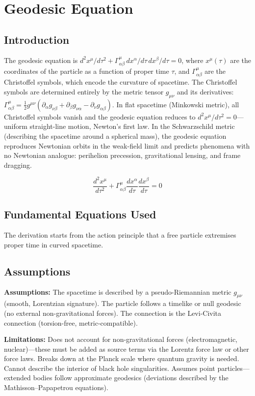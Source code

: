 \chapter{Geodesic Equation}

\section*{Introduction}

The geodesic equation is $d^2 x^\mu/d\tau^2 + \Gamma^\mu_{\alpha\beta}\,dx^\alpha/d\tau\,dx^\beta/d\tau = 0$, where $x^\mu(\tau)$ are the coordinates of the particle as a function of proper time $\tau$, and $\Gamma^\mu_{\alpha\beta}$ are the Christoffel symbols, which encode the curvature of spacetime. The Christoffel symbols are determined entirely by the metric tensor $g_{\mu\nu}$ and its derivatives: $\Gamma^\mu_{\alpha\beta} = \frac{1}{2}g^{\mu\nu}(\partial_\alpha g_{\nu\beta} + \partial_\beta g_{\nu\alpha} - \partial_\nu g_{\alpha\beta})$. In flat spacetime (Minkowski metric), all Christoffel symbols vanish and the geodesic equation reduces to $d^2 x^\mu/d\tau^2 = 0$---uniform straight-line motion, Newton's first law. In the Schwarzschild metric (describing the spacetime around a spherical mass), the geodesic equation reproduces Newtonian orbits in the weak-field limit and predicts phenomena with no Newtonian analogue: perihelion precession, gravitational lensing, and frame dragging.


\[
\frac{d^2 x^\mu}{d\tau^2}+\Gamma^\mu_{\alpha\beta}\frac{dx^\alpha}{d\tau}\frac{dx^\beta}{d\tau}=0
\]

\section*{Fundamental Equations Used}

The derivation starts from the action principle that a free particle extremises proper time in curved spacetime.

\section*{Assumptions}

\textbf{Assumptions:} The spacetime is described by a pseudo-Riemannian metric $g_{\mu\nu}$ (smooth, Lorentzian signature). The particle follows a timelike or null geodesic (no external non-gravitational forces). The connection is the Levi-Civita connection (torsion-free, metric-compatible).


\textbf{Limitations:} Does not account for non-gravitational forces (electromagnetic, nuclear)---these must be added as source terms via the Lorentz force law or other force laws. Breaks down at the Planck scale where quantum gravity is needed. Cannot describe the interior of black hole singularities. Assumes point particles---extended bodies follow approximate geodesics (deviations described by the Mathisson--Papapetrou equations).


